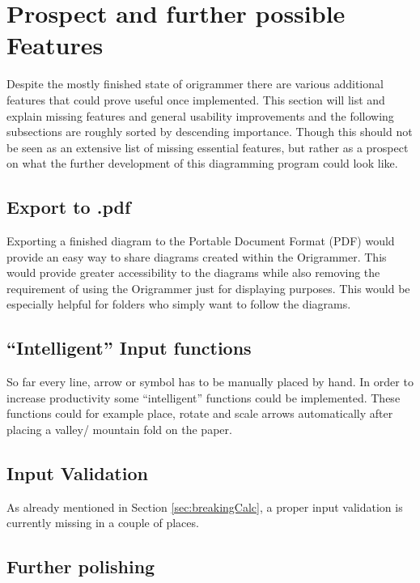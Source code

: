 
\section{Prospect and further possible Features}
\label{sec:prospect}

Despite the mostly finished state of \gls{origrammer} there are various additional features that could prove useful once implemented. This section will list and explain missing features and general usability improvements and the following subsections are roughly sorted by descending importance. Though this should not be seen as an extensive list of missing essential features, but rather as a prospect on what the further development of this diagramming program could look like. 

\subsection{Export to .pdf}

Exporting a finished diagram to the Portable Document Format (PDF) would provide an easy way to share diagrams created within the Origrammer. This would provide greater accessibility to the diagrams while also removing the requirement of using the Origrammer just for displaying purposes. This would be especially helpful for folders who simply want to follow the diagrams.

\subsection{``Intelligent'' Input functions}

So far every line, arrow or symbol has to be manually placed by hand. In order to increase productivity some ``intelligent'' functions could be implemented. These functions could for example place, rotate and scale arrows automatically after placing a valley/ mountain fold on the paper.

\subsection{Input Validation}

As already mentioned in Section \ref{sec:breakingCalc}, a proper input validation is currently missing in a couple of places. 

\subsection{Further polishing}



